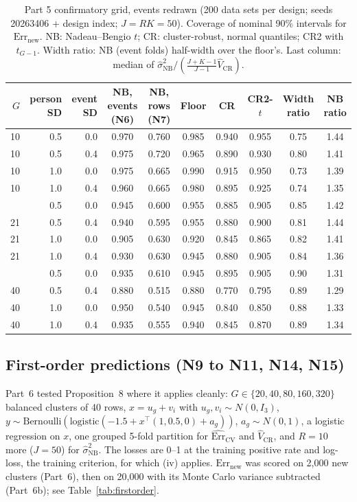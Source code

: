 \documentclass[11pt]{amsart}
\theoremstyle{plain}
\theoremstyle{definition}
\theoremstyle{remark}
\newcommand{\CV}{\widehat{\mathrm{Err}}_{\mathrm{CV}}}
\newcommand{\Errnew}{\mathrm{Err}_{\mathrm{new}}}
\newcommand{\VCR}{\hat V_{\mathrm{CR}}}
\newcommand{\VNB}{\hat\sigma^2_{\mathrm{NB}}}
\newcommand{\fac}{\tfrac{J+K-1}{J-1}}
\begin{document}
\begin{table}[tbp]
\centering\footnotesize
\caption{Part 5 confirmatory grid, events redrawn (200 data sets per design; seeds 20263406 + design index; $J=RK=50$). Coverage of nominal 90\% intervals for $\Errnew$. NB: Nadeau--Bengio $t$; CR: cluster-robust, normal quantiles; CR2 with $t_{G-1}$. Width ratio: NB (event folds) half-width over the floor's. Last column: median of $\VNB/(\fac\VCR)$.}\label{tab:confirm}
\begin{tabular}{@{}r r r c c c c c c c@{}}
\toprule
$G$ & person SD & event SD & NB, events (N6) & NB, rows (N7) & Floor & CR & CR2-$t$ & Width ratio & NB ratio\\
\midrule
10 & 0.5 & 0.0 & 0.970 & 0.760 & 0.985 & 0.940 & 0.955 & 0.75 & 1.44 \\
10 & 0.5 & 0.4 & 0.975 & 0.720 & 0.965 & 0.890 & 0.930 & 0.80 & 1.41 \\
10 & 1.0 & 0.0 & 0.975 & 0.665 & 0.990 & 0.915 & 0.950 & 0.73 & 1.39 \\
10 & 1.0 & 0.4 & 0.960 & 0.665 & 0.980 & 0.895 & 0.925 & 0.74 & 1.35 \\
\addlinespace
21 & 0.5 & 0.0 & 0.945 & 0.600 & 0.955 & 0.885 & 0.905 & 0.85 & 1.42 \\
21 & 0.5 & 0.4 & 0.940 & 0.595 & 0.955 & 0.880 & 0.900 & 0.81 & 1.44 \\
21 & 1.0 & 0.0 & 0.905 & 0.630 & 0.920 & 0.845 & 0.865 & 0.82 & 1.41 \\
21 & 1.0 & 0.4 & 0.930 & 0.630 & 0.945 & 0.880 & 0.905 & 0.84 & 1.36 \\
\addlinespace
40 & 0.5 & 0.0 & 0.935 & 0.610 & 0.945 & 0.895 & 0.905 & 0.90 & 1.31 \\
40 & 0.5 & 0.4 & 0.880 & 0.515 & 0.880 & 0.770 & 0.795 & 0.89 & 1.29 \\
40 & 1.0 & 0.0 & 0.950 & 0.540 & 0.945 & 0.840 & 0.850 & 0.88 & 1.33 \\
40 & 1.0 & 0.4 & 0.935 & 0.555 & 0.940 & 0.845 & 0.870 & 0.89 & 1.34 \\
\bottomrule
\end{tabular}
\end{table}

\subsection{First-order predictions (N9 to N11, N14, N15)}

Part~6 tested Proposition~8 where it applies cleanly: $G\in\{20,40,80,160,320\}$ balanced clusters of 40 rows, $x=u_g+v_i$ with $u_g,v_i\sim N(0,I_3)$, $y\sim\mathrm{Bernoulli}(\mathrm{logistic}(-1.5+x^\top(1,0.5,0)+a_g))$, $a_g\sim N(0,1)$, a logistic regression on $x$, one grouped 5-fold partition for $\CV$ and $\VCR$, and $R=10$ more ($J=50$) for $\VNB$. The losses are 0--1 at the training positive rate and log-loss, the training criterion, for which (iv) applies. $\Errnew$ was scored on 2,000 new clusters (Part~6), then on 20,000 with its Monte Carlo variance subtracted (Part~6b); see Table~\ref{tab:firstorder}.
\end{document}
